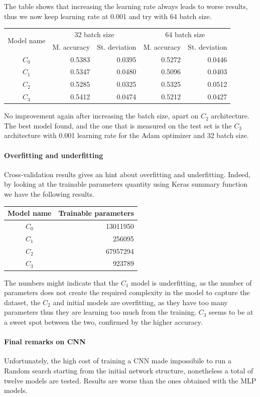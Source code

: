 The table shows that increasing the learning rate always leads to worse results, thus 
we now keep learning rate at 0.001 and try with 64 batch size.

\begin{center}
    \begin{tabular}{ |c|r|r|r|r| } 
        \hline
        \multirow{2}{*}{Model name} & \multicolumn{2}{c|}{32 batch size} & \multicolumn{2}{c|}{64 batch size}  \\
        \cline{2-5}
        & M. accuracy & St. deviation & M. accuracy & St. deviation \\
        \hline
        $C_0$ & 0.5383 & 0.0395 & 0.5272 & 0.0446 \\
        $C_1$ & 0.5347 & 0.0480 & 0.5096 & 0.0403 \\
        $C_2$ & 0.5285 & 0.0325 & 0.5325 & 0.0512 \\
        $C_3$ & 0.5412 & 0.0474 & 0.5212 & 0.0427 \\
        \hline
    \end{tabular}
\end{center}

No improvement again after increasing the batch size, apart on $C_2$ architecture.
The best model found, and the one that is measured on the test set is 
the $C_3$ architecture with 0.001 learning rate for the Adam optimizer
and 32 batch size.

\paragraph{Overfitting and underfitting}
Cross-validation results gives an hint about overfitting and underfitting. Indeed, 
by looking at the trainable parameters quantity using Keras summary function we have the following results.
\begin{center}
    \begin{tabular}{ |c|r| } 
        \hline
        Model name & Trainable parameters\\
        \hline
        $C_0$ & 13011950 \\
        $C_1$ & 256095 \\
        $C_2$ & 67957294 \\
        $C_3$ & 923789 \\
        \hline
    \end{tabular}
\end{center}
The numbers might indicate that the $C_1$ model is underfitting, as the number 
of parameters does not create the required complexity in the model to capture the dataset, 
the $C_2$ and initial models are overfitting, as they have too many parameters 
thus they are learning too much from the training. 
$C_3$ seems to be at a sweet spot between the two, confirmed by the higher accuracy.

\paragraph{Final remarks on CNN}
Unfortunately, the high cost of training a CNN made impossibile to run a Random search 
starting from the initial network structure, nonetheless a total 
of twelve models are tested. Results are worse than the ones obtained 
with the MLP models. 
\newpage